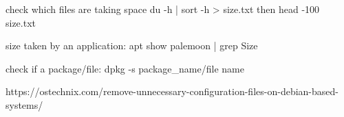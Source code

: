 check which files are taking space du -h | sort -h > size.txt then head -100 size.txt

size taken by an application: apt show palemoon | grep Size

check if a package/file: dpkg -s package_name/file name

https://ostechnix.com/remove-unnecessary-configuration-files-on-debian-based-systems/
